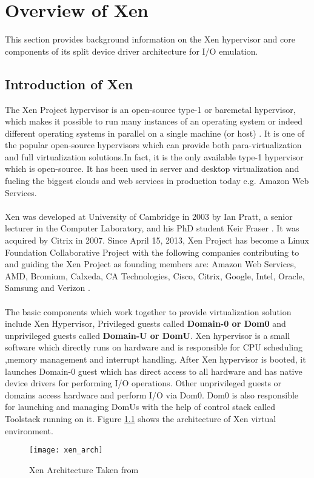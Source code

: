 \chapter{Overview of Xen\label{cha:chapter3}}
This section provides background information on the Xen hypervisor and core components of its split device driver architecture for I/O emulation.

\section{Introduction of Xen\label{sec:xen}}
The Xen Project hypervisor is an open-source type-1 or baremetal hypervisor, which makes it possible to run many instances of an operating system or indeed different operating systems in parallel on a single machine (or host) \cite{xen}. It is one of the popular open-source hypervisors which can provide both para-virtualization and full virtualization solutions.In fact, it is the only available type-1 hypervisor which is open-source. It has been used in server and desktop virtualization and fueling the biggest clouds and web services in production today e.g. Amazon Web Services. 
\\
\\
Xen was developed at University of Cambridge in 2003 by Ian Pratt, a senior lecturer in the Computer Laboratory, and his PhD student Keir Fraser \cite{xen_wiki}. It was acquired by Citrix in 2007. Since April 15, 2013, Xen Project has become a Linux Foundation Collaborative Project with the following companies  contributing to and guiding the Xen Project as founding members are: Amazon Web Services, AMD, Bromium, Calxeda, CA Technologies, Cisco, Citrix, Google, Intel, Oracle, Samsung and Verizon \cite{xen_news}.
\\
\\
The basic components which work together to provide virtualization solution include Xen Hypervisor, Privileged guests called \textbf{Domain-0 or Dom0} and unprivileged guests called \textbf{Domain-U or DomU}. Xen hypervisor is a small software which directly runs on hardware and is responsible for CPU scheduling ,memory management and interrupt handling. After Xen hypervisor is booted, it launches Domain-0 guest which has direct access to all hardware and has native device drivers for performing I/O operations. Other unprivileged guests or domains access hardware and perform I/O via Dom0. Dom0 is also responsible for launching and managing DomUs with the help of control stack called Toolstack running on it. Figure \ref{xen_arch} shows the architecture of Xen virtual environment.
\begin{figure}[!htbp]
	\centering
	\texttt{[image: xen\_arch]}
	\caption{Xen Architecture Taken from \cite{xen_wiki}}
	\label{xen_arch}
\end{figure}
\\
\\
